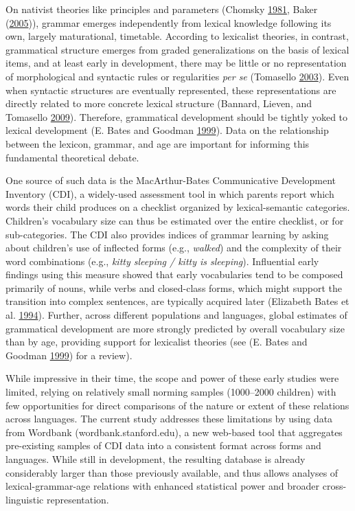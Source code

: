 \documentclass[authoryear, review]{elsarticle}
\begin{document}
On nativist theories like principles and parameters (Chomsky
\hyperref[ref-chomsky1981]{1981}, Baker
(\hyperref[ref-baker2005]{2005})), grammar emerges independently from
lexical knowledge following its own, largely maturational, timetable.
According to lexicalist theories, in contrast, grammatical structure
emerges from graded generalizations on the basis of lexical items, and
at least early in development, there may be little or no representation
of morphological and syntactic rules or regularities \emph{per se}
(Tomasello \hyperref[ref-tomasello2003]{2003}). Even when syntactic
structures are eventually represented, these representations are
directly related to more concrete lexical structure (Bannard, Lieven,
and Tomasello \hyperref[ref-bannard2009]{2009}). Therefore, grammatical
development should be tightly yoked to lexical development (E. Bates and
Goodman \hyperref[ref-bates1999]{1999}). Data on the relationship
between the lexicon, grammar, and age are important for informing this
fundamental theoretical debate.

One source of such data is the MacArthur-Bates Communicative Development
Inventory (CDI), a widely-used assessment tool in which parents report
which words their child produces on a checklist organized by
lexical-semantic categories. Children's vocabulary size can thus be
estimated over the entire checklist, or for sub-categories. The CDI also
provides indices of grammar learning by asking about children's use of
inflected forms (e.g., \emph{walked}) and the complexity of their word
combinations (e.g., \emph{kitty sleeping / kitty is sleeping}).
Influential early findings using this measure showed that early
vocabularies tend to be composed primarily of nouns, while verbs and
closed-class forms, which might support the transition into complex
sentences, are typically acquired later (Elizabeth Bates et al.
\hyperref[ref-bates1994]{1994}). Further, across different populations
and languages, global estimates of grammatical development are more
strongly predicted by overall vocabulary size than by age, providing
support for lexicalist theories (see (E. Bates and Goodman
\hyperref[ref-bates1999]{1999}) for a review).

While impressive in their time, the scope and power of these early
studies were limited, relying on relatively small norming samples
(1000--2000 children) with few opportunities for direct comparisons of
the nature or extent of these relations across languages. The current
study addresses these limitations by using data from Wordbank
(wordbank.stanford.edu), a new web-based tool that aggregates
pre-existing samples of CDI data into a consistent format across forms
and languages. While still in development, the resulting database is
already considerably larger than those previously available, and thus
allows analyses of lexical-grammar-age relations with enhanced
statistical power and broader cross-linguistic representation.
\end{document}
